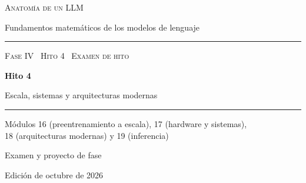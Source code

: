\documentclass[11pt,a4paper,twoside,openany]{book}
\renewcommand{\thechapter}{\Alph{chapter}}
\begin{document}
\frontmatter
\begin{titlepage}
\centering
\vspace*{2.5cm}
{\large\scshape Anatomía de un LLM}\par
\vspace{0.4cm}
{\normalsize Fundamentos matemáticos de los modelos de lenguaje}\par
\vspace{2.2cm}
\rule{\textwidth}{0.8pt}\par\vspace{0.5cm}
{\small\scshape Fase IV \textperiodcentered\ Hito 4 \textperiodcentered\ Examen de hito}\par\vspace{0.3cm}
{\Huge\bfseries Hito 4\par}\vspace{0.3cm}
{\LARGE Escala, sistemas y arquitecturas modernas\par}
\vspace{0.5cm}\rule{\textwidth}{0.4pt}\par
\vspace{1.0cm}
{\normalsize Módulos 16 (preentrenamiento a escala), 17 (hardware y sistemas),\\ 18 (arquitecturas modernas) y 19 (inferencia)\par}
\vspace{1.4cm}
{\large Examen y proyecto de fase}\par
\vfill
{\small Edición de octubre de 2026}\par
\end{titlepage}



\tableofcontents

\mainmatter




\appendix
\renewcommand{\thechapter}{\Roman{chapter}}



\backmatter

\end{document}
